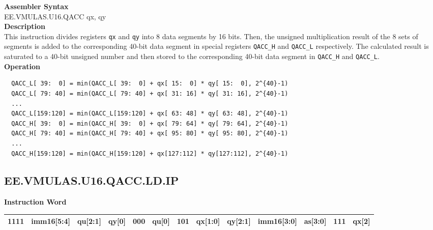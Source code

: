 \textbf{Assembler Syntax} \\
EE.VMULAS.U16.QACC qx, qy \\
\textbf{Description} \\
This instruction divides registers \lstinline{qx} and \lstinline{qy} into 8 data segments by 16 bits. Then, the unsigned multiplication result of the 8 sets of segments is added to the corresponding 40-bit data segment in special registers \lstinline{QACC_H} and \lstinline{QACC_L} respectively. The calculated result is saturated to a 40-bit unsigned number and then stored to the corresponding 40-bit data segment in \lstinline{QACC_H} and \lstinline{QACC_L}.\\
\textbf{Operation}
\begin{lstlisting}
  QACC_L[ 39:  0] = min(QACC_L[ 39:  0] + qx[ 15:  0] * qy[ 15:  0], 2^{40}-1)
  QACC_L[ 79: 40] = min(QACC_L[ 79: 40] + qx[ 31: 16] * qy[ 31: 16], 2^{40}-1)
  ...
  QACC_L[159:120] = min(QACC_L[159:120] + qx[ 63: 48] * qy[ 63: 48], 2^{40}-1)
  QACC_H[ 39:  0] = min(QACC_H[ 39:  0] + qx[ 79: 64] * qy[ 79: 64], 2^{40}-1)
  QACC_H[ 79: 40] = min(QACC_H[ 79: 40] + qx[ 95: 80] * qy[ 95: 80], 2^{40}-1)
  ...
  QACC_H[159:120] = min(QACC_H[159:120] + qx[127:112] * qy[127:112], 2^{40}-1)
\end{lstlisting}

\clearpage
\subsection{EE.VMULAS.U16.QACC.LD.IP}\label{instruction:EEVMULASU16QACCLDIP}
\setlength\tabcolsep{6pt}
\textbf{Instruction Word} \\
\begin{tabular}{|c|c|c|c|c|c|c|c|c|c|c|c|c|}
	\hline
	1111 & imm16[5:4] & qu[2:1] & qy[0] & 000 & qu[0] & 101 & qx[1:0] & qy[2:1] & imm16[3:0] & as[3:0] & 111 & qx[2] \\
	\hline
\end{tabular}

